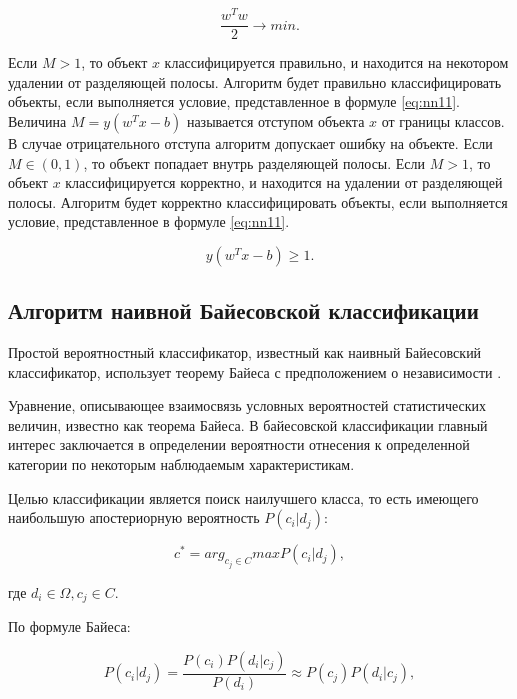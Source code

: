 \begin{equation}
	\label{eq:nn10}
	\frac{w^Tw}{2} \rightarrow min.
\end{equation}

 Если $M > 1$, то объект $x$ классифицируется правильно, и находится на некотором удалении от разделяющей полосы. Алгоритм будет правильно классифицировать объекты, если выполняется условие, представленное в формуле \ref{eq:nn11}.
Величина $M=y(w^Tx-b)$ называется отступом объекта $x$ от границы классов. В случае отрицательного отступа алгоритм допускает ошибку на объекте. Если $M \in (0, 1)$,
то объект попадает внутрь разделяющей полосы. Если $M > 1$, то объект $x$ классифицируется корректно, и находится на удалении от разделяющей полосы. Алгоритм будет корректно классифицировать объекты, если выполняется условие, представленное в формуле \ref{eq:nn11}.

\begin{equation}
	\label{eq:nn11}
	y(w^Tx-b) \geq 1.
\end{equation}

\subsection{Алгоритм наивной Байесовской классификации}

Простой вероятностный классификатор, известный как наивный Байесовский классификатор, использует теорему Байеса с предположением о независимости \cite[]{twelve}.

Уравнение, описывающее взаимосвязь условных вероятностей статистических величин, известно как теорема Байеса. В байесовской классификации главный интерес заключается в определении вероятности отнесения к определенной категории по некоторым наблюдаемым характеристикам.

Целью классификации является поиск наилучшего класса, то есть имеющего наибольшую апостериорную вероятность $P(c_i|d_j)$:

\begin{equation}
	\label{eq:nn12}
    c^* = arg_{c_j \in C} maxP(c_i|d_j),
\end{equation}

где $d_i \in \Omega, c_j \in C$.

По формуле Байеса:

\begin{equation}
	\label{eq:nn13}
    P(c_i|d_j) = \frac{P(c_i)P(d_i|c_j)}{P(d_i)} \approx P(c_j)P(d_i|c_j), 
\end{equation}

